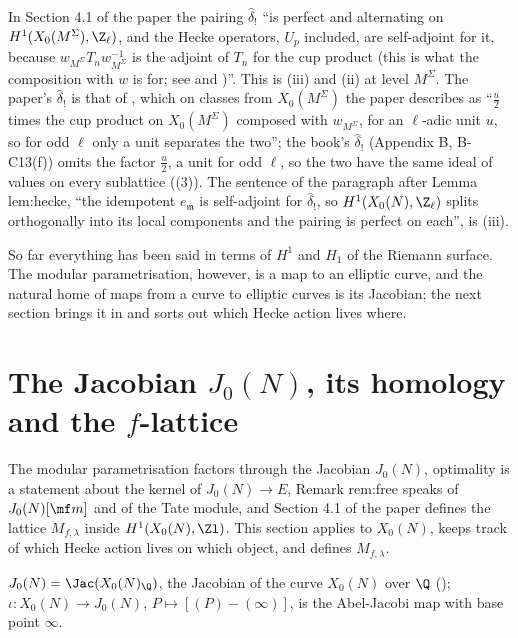 \begin{paperlink}\label{pl:moddeg:delta-hat}
In Section 4.1 of the paper the pairing $\hat\delta_!$ ``is perfect and alternating on $H^1(X_0(M^\Sigma),\Z_\ell)$, and the Hecke operators, $U_p$ included, are self-adjoint for it,
because $w_{M^\Sigma}T_nw_{M^\Sigma}^{-1}$ is the adjoint of $T_n$ for the cup product (this is what the composition with $w$ is for; see \cite[\S\S1.6.1, 1.8.2]{DFG04} and \cite[\S4.4]{DDT})''.
This is (iii) and (ii) at level $M^\Sigma$. The paper's $\hat\delta_!$ is that of \cite{DFG04}, which on classes from
$X_0(M^\Sigma)$ the paper describes as ``$\frac u2$ times the cup product on $X_0(M^\Sigma)$ composed with $w_{M^\Sigma}$, for an $\ell$-adic unit $u$, so for odd $\ell$ only a unit separates the two'';
the book's $\hat\delta_!$ (Appendix B, B-C13(f)) omits the factor $\frac u2$, a unit for odd $\ell$, so the two have the same ideal of values on every sublattice ((3)). The sentence of the paragraph after Lemma lem:hecke, ``the
idempotent $e_{\mathfrak m}$ is self-adjoint for $\hat\delta_!$, so $H^1(X_0(N),\Z_\ell)$ splits orthogonally into its local components and the pairing is perfect on each'', is
(iii).
\end{paperlink}

So far everything has been said in terms of $H^1$ and $H_1$ of the Riemann surface. The modular parametrisation, however, is a map to an elliptic curve, and the
natural home of maps from a curve to elliptic curves is its Jacobian; the next section brings it in and sorts out which Hecke action lives where.

\section{The Jacobian \texorpdfstring{$J_0(N)$}{J0(N)}, its homology and the \texorpdfstring{$f$}{f}-lattice}\label{sec:moddeg:jacobian}

The modular parametrisation factors through the Jacobian $J_0(N)$, optimality is a statement about the kernel of $J_0(N)\to E$, Remark rem:free speaks of $J_0(N)[\mf m]$
and of the Tate module, and Section 4.1 of the paper defines the lattice $M_{f,\lambda}$ inside $H^1(X_0(N),\Zl)$. This section applies  to $X_0(N)$, keeps
track of which Hecke action lives on which object, and defines $M_{f,\lambda}$.

\begin{definition}[$J_0(N)$]\label{def:moddeg:j0}
$J_0(N)=\Jac(X_0(N)_\Q)$, the Jacobian of the curve $X_0(N)$ over $\Q$ (); $\iota\colon X_0(N)\to J_0(N)$, $P\mapsto[(P)-(\infty)]$, is the Abel-Jacobi map with base
point $\infty$.
\end{definition}

